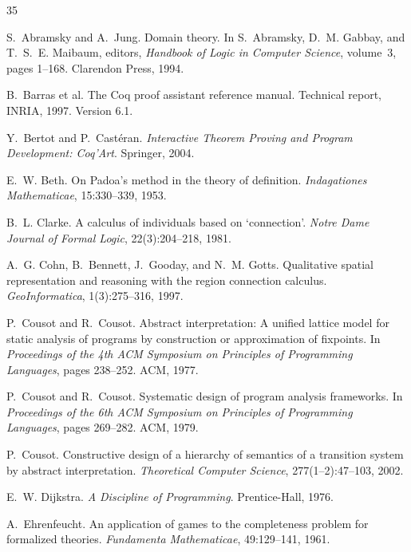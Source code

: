 \documentclass[12pt]{article}
\theoremstyle{plain}
\theoremstyle{definition}
\theoremstyle{remark}
\begin{document}

\begin{thebibliography}{35}

S.~Abramsky and A.~Jung.
\newblock Domain theory.
\newblock In S.~Abramsky, D.~M. Gabbay, and T.~S.~E. Maibaum, editors,
  \emph{Handbook of Logic in Computer Science}, volume~3, pages 1--168.
  Clarendon Press, 1994.

B.~Barras et al.
\newblock The {Coq} proof assistant reference manual.
\newblock Technical report, INRIA, 1997. Version 6.1.

Y.~Bertot and P.~Cast\'{e}ran.
\newblock \emph{Interactive Theorem Proving and Program Development:
  Coq'Art}.
\newblock Springer, 2004.

E.~W. Beth.
\newblock On {P}adoa's method in the theory of definition.
\newblock \emph{Indagationes Mathematicae}, 15:330--339, 1953.

B.~L. Clarke.
\newblock A calculus of individuals based on `connection'.
\newblock \emph{Notre Dame Journal of Formal Logic}, 22(3):204--218, 1981.

A.~G. Cohn, B.~Bennett, J.~Gooday, and N.~M. Gotts.
\newblock Qualitative spatial representation and reasoning with the region
  connection calculus.
\newblock \emph{GeoInformatica}, 1(3):275--316, 1997.

P.~Cousot and R.~Cousot.
\newblock Abstract interpretation: A unified lattice model for static analysis
  of programs by construction or approximation of fixpoints.
\newblock In \emph{Proceedings of the 4th {ACM} Symposium on Principles of
  Programming Languages}, pages 238--252. {ACM}, 1977.

P.~Cousot and R.~Cousot.
\newblock Systematic design of program analysis frameworks.
\newblock In \emph{Proceedings of the 6th {ACM} Symposium on Principles of
  Programming Languages}, pages 269--282. {ACM}, 1979.

P.~Cousot.
\newblock Constructive design of a hierarchy of semantics of a transition
  system by abstract interpretation.
\newblock \emph{Theoretical Computer Science}, 277(1--2):47--103, 2002.

E.~W. Dijkstra.
\newblock \emph{A Discipline of Programming}.
\newblock Prentice-Hall, 1976.

A.~Ehrenfeucht.
\newblock An application of games to the completeness problem for formalized
  theories.
\newblock \emph{Fundamenta Mathematicae}, 49:129--141, 1961.


\end{thebibliography}
\end{document}
